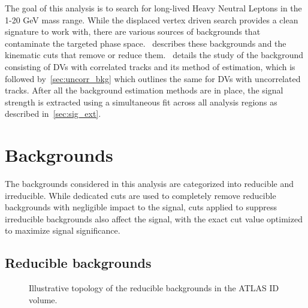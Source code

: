 The goal of this analysis is to search for long-lived Heavy Neutral Leptons in the 1-20 GeV mass range. While the displaced vertex driven search provides a clean signature to work with, there are various sources of backgrounds that contaminate the targeted phase space.~ describes these backgrounds and the kinematic cuts that remove or reduce them.~ details the study of the background consisting of DVs with correlated tracks and its method of estimation, which is followed by~\cref{sec:uncorr_bkg} which outlines the same for DVs with uncorrelated tracks. After all the background estimation methods are in place, the signal strength is extracted using a simultaneous fit across all analysis regions as described in~\cref{sec:sig_ext}.

\section{Backgrounds}\label{sec:backgrounds}
The backgrounds considered in this analysis are categorized into reducible and irreducible. While dedicated cuts are used to completely remove reducible backgrounds with negligible impact to the signal, cuts applied to suppress irreducible backgrounds also affect the signal, with the exact cut value optimized to maximize signal significance.

\subsection{Reducible backgrounds}
\begin{figure}[!ht]
    \centering
     \caption{Illustrative topology of the reducible backgrounds in the ATLAS ID volume.}
     \label{fig:bkg_reducible}
\end{figure}

